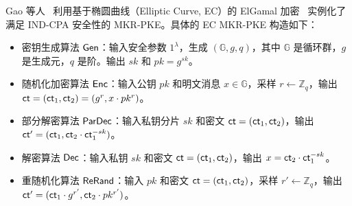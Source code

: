 Gao 等人~\cite{GNT-eprint-2023} 利用基于椭圆曲线（Elliptic Curve, EC）的 ElGamal 加密~\cite{ElGamal-IEEE-IT-1985} 实例化了满足 IND-CPA 安全性的 MKR-PKE。具体的 EC MKR-PKE 构造如下：

\begin{itemize}
\item 密钥生成算法 $\mathsf{Gen}$：输入安全参数 $1^\lambda$，生成 $(\mathbb{G},g,q)$，其中 $\mathbb{G}$ 是循环群，$g$ 是生成元，$q$ 是阶。输出 $sk$ 和 $pk = g^{sk}$。
\item 随机化加密算法 $\mathsf{Enc}$：输入公钥 $pk$ 和明文消息 $x \in \mathbb{G}$，采样 $r \gets \mathbb{Z}_q$，输出 $\mathsf{ct} = (\mathsf{ct}_1, \mathsf{ct}_2) = (g^r, x \cdot pk^r)$。
\item 部分解密算法 $\mathsf{ParDec}$：输入私钥分片 $sk$ 和密文 $\mathsf{ct} = (\mathsf{ct}_1, \mathsf{ct}_2)$，输出 $\mathsf{ct}' = (\mathsf{ct}_1, \mathsf{ct}_2 \cdot \mathsf{ct}_1^{-sk})$。
\item 解密算法 $\mathsf{Dec}$：输入私钥 $sk$ 和密文 $\mathsf{ct} = (\mathsf{ct}_1, \mathsf{ct}_2)$，输出 $x = \mathsf{ct}_2 \cdot \mathsf{ct}_1^{-sk}$。
\item 重随机化算法 $\mathsf{ReRand}$：输入 $pk$ 和密文 $\mathsf{ct} = (\mathsf{ct}_1, \mathsf{ct}_2)$，采样 $r' \gets \mathbb{Z}_q$，输出 $\mathsf{ct}' = (\mathsf{ct}_1 \cdot g^{r'}, \mathsf{ct}_2 \cdot pk^{r'})$。
\end{itemize}

